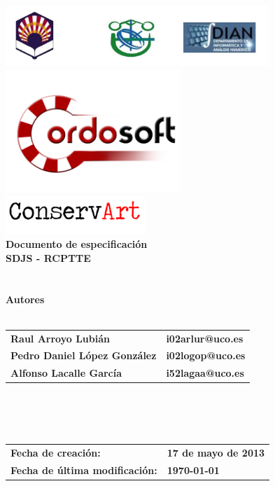 \documentclass[a4paper,11pt]{article}
\begin{document}
	\begin{titlepage}
		\begin{center}
			\includegraphics[width=375px]{Universidad.png} \\
            \includegraphics[width=250px]{logo_cordosoft.png} \\
            \includegraphics[width=200px]{conservart_logo.png} \\
			\textbf{\LARGE Documento de especificación} \\
			\textbf{\Large SDJS - RCPTTE} \\
			\\
			\textbf{}
			\\
			\textbf{Autores}
			\\
			\textbf{}
			\\
			\begin{tabular}{l l}
				\textbf{Raul Arroyo Lubián} & \textbf{i02arlur@uco.es} \\	
				\textbf{Pedro Daniel López González} & \textbf{i02logop@uco.es} \\
				\textbf{Alfonso Lacalle García} & \textbf{i52lagaa@uco.es} \\
			\end{tabular}
			\\
			\textbf{}
			\\
			\textbf{}
			\\
			\begin{tabular}{l l}
				\textbf{Fecha de creación:} & \textbf{17 de mayo de 2013} \\
				\textbf{Fecha de última modificación:} & \textbf{\today } \\
			\end{tabular}
		\end{center}
    \end{titlepage}
\end{document}
